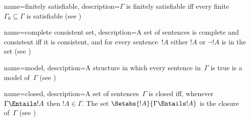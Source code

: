  {
  name={finitely satisfiable},  
  description={$\Gamma$ is finitely satisfiable iff every finite
    $\Gamma_0 \subseteq \Gamma$ is satisfiable (see
    )} }

 {
  name=complete consistent set,
  description={A set of {sentence}s is complete and consistent iff it
    is consistent, and for every {sentence}~$!A$ either $!A$ or
    $\lnot !A$ is in the set (see )} }

 {
  name=model,  
  description={A {structure} in which every {sentence}
    in~$\Gamma$ is true is a model of~$\Gamma$ (see
    )} }

 {
  name=closed, 
  description={A set of {sentence}s~$\Gamma$ is closed iff, whenever
    $\Gamma \Entails !A$ then $!A \in \Gamma$. The set
    $\Setabs{!A}{\Gamma \Entails !A}$ is the closure of~$\Gamma$ (see
    )} }

